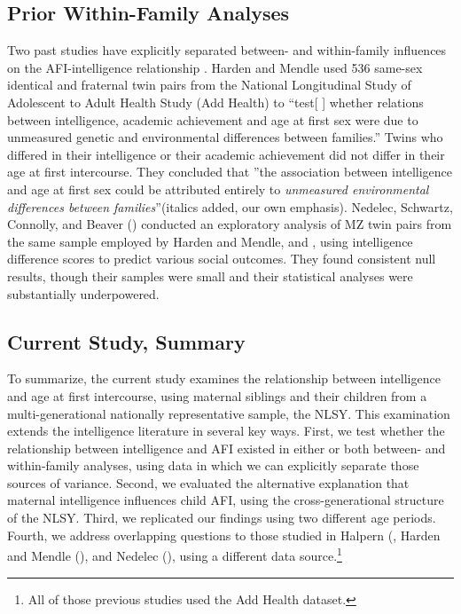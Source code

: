 \documentclass[a4paper,man,apacite,natbib,12pt,longtable]{apa6}\usepackage[]{graphicx}\usepackage[]{color}
\begin{document}
\subsection{Prior Within-Family Analyses} Two past studies have explicitly separated between- and within-family influences on the AFI-intelligence relationship \citep{harden2011don,nedelec2012exploring}. Harden and Mendle used 536 same-sex identical and fraternal twin pairs from the National Longitudinal Study of Adolescent to Adult Health Study (Add Health) to ``test[ ] whether relations between intelligence, academic achievement and age at first sex were due to unmeasured genetic and environmental differences between families.'' Twins who differed in their intelligence or their academic achievement did not differ in their age at first intercourse. They concluded that ''the association between intelligence and age at first sex could be attributed entirely to \textit{unmeasured environmental differences between families}''(italics added, our own emphasis). Nedelec, Schwartz, Connolly, and Beaver (\citeyear{nedelec2012exploring}) conducted an exploratory analysis of MZ twin pairs from the same sample employed by Harden and Mendle, and \citet{halpern2000smart}, using intelligence difference scores to predict various social outcomes. They found consistent null results, though their samples were small and their statistical analyses were substantially underpowered.

\subsection{Current Study, Summary}
To summarize, the current study examines the relationship between intelligence and age at first intercourse, using maternal siblings and their children from a multi-generational nationally representative sample, the NLSY. This examination extends the intelligence literature in several key ways. First, we test whether the relationship between intelligence and AFI existed in either or both between- and within-family analyses, using data in which we can explicitly separate those sources of variance. Second, we evaluated the alternative explanation that maternal intelligence influences child AFI, using the cross-generational structure of the NLSY. Third, we replicated our findings using two different age periods. Fourth, we address overlapping questions to those studied in Halpern \et (\citeyear{halpern2000smart}, Harden and Mendle (\citeyear{harden2011don}), and Nedelec \et (\citeyear{nedelec2012exploring}), using a different data source.\footnote{All of those previous studies used the Add Health dataset.}
\end{document}
